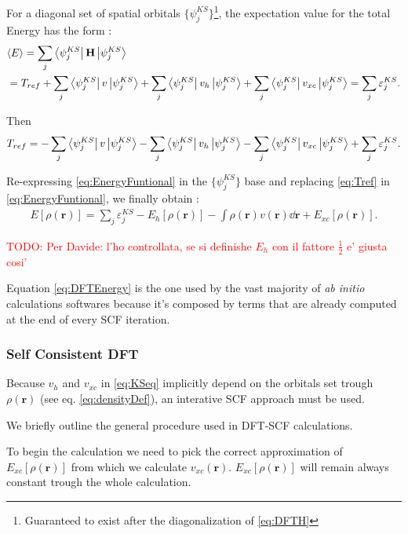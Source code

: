 \documentclass[a4paper,12pt]{article}
\newcommand\mynotes[1]{\begin{flushright}

\textcolor{red}{TODO: #1}\end{flushright}}
\newcommand\dens{\rho(\mathbf{r})}
\newcommand\erre{\mathbf{r}}
\begin{document}
For a diagonal set of spatial orbitals $\{\psi^{KS}_{j}\}$\footnote{Guaranteed to exist after the diagonalization of \eqref{eq:DFTH}}, the expectation value for the total Energy has the form :
\begin{align}
	& \langle E \rangle = \sum_{j} \bra{\psi^{KS}_{j}}\mathbf{H}\ket{\psi^{KS}_{j}} \\
	&= T_{ref} + \sum_{j} \bra{\psi^{KS}_{j}}v\ket{\psi^{KS}_{j}} + \sum_{j} \bra{\psi^{KS}_{j}}v_{h}\ket{\psi^{KS}_{j}} + \sum_{j} \bra{\psi^{KS}_{j}}v_{xc}\ket{\psi^{KS}_{j}} = 
	\sum_{j} \varepsilon^{KS}_{j} .
\end{align}

Then 
\begin{equation}\label{eq:Tref}
T_{ref} = - \sum_{j} \bra{\psi^{KS}_{j}}v\ket{\psi^{KS}_{j}} - \sum_{j} \bra{\psi^{KS}_{j}}v_{h}\ket{\psi^{KS}_{j}} - \sum_{j} \bra{\psi^{KS}_{j}}v_{xc}\ket{\psi^{KS}_{j}} + \sum_{j} \varepsilon^{KS}_{j} .
\end{equation}

Re-expressing \eqref{eq:EnergyFuntional} in the $\{\psi^{KS}_{j}\}$ base and replacing \eqref{eq:Tref} in \eqref{eq:EnergyFuntional}, we finally obtain :
\begin{align}\label{eq:DFTEnergy}
	E[\dens] = \sum_{j}\varepsilon^{KS}_{j} - E_{h}[\dens] - \int \dens v(\erre) \dd{\erre}+ E_{xc}[\dens].
\end{align}
\mynotes{Per Davide: l'ho controllata, se si definishe $E_{h}$ con il fattore $\frac{1}{2}$ e' giusta cosi'}
Equation \eqref{eq:DFTEnergy} is the one used by the vast majority of \textit{ab initio} calculations softwares because it's composed by terms that are already computed at the end of every SCF iteration.





\subsubsection{Self Consistent DFT}
Because $v_{h}$ and $v_{xc}$ in \eqref{eq:KSeq} implicitly depend on the orbitals set trough $\dens$ (see eq. \eqref{eq:densityDef}), an interative SCF approach must be used. 

We briefly outline the general procedure used in DFT-SCF calculations.

To begin the calculation we need to pick the correct approximation of $E_{xc}[\dens]$ from which we calculate $v_{xc}(\erre)$. $E_{xc}[\dens]$ will remain always constant trough the whole calculation.
\end{document}
